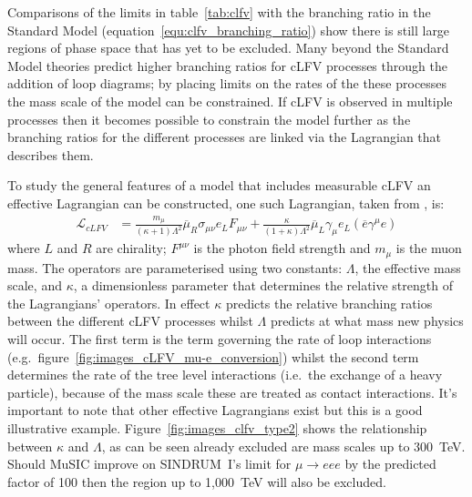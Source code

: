 Comparisons of the limits in table~\ref{tab:clfv} with the branching ratio in the Standard Model (equation~\eqref{equ:clfv_branching_ratio}) show there is still large regions of phase space that has yet to be excluded. Many beyond the Standard Model theories predict higher branching ratios for cLFV processes through the addition of loop diagrams; by placing limits on the rates of the these processes the mass scale of the model can be constrained. If cLFV is observed in multiple processes then it becomes possible to constrain the model further as the branching ratios for the different processes are linked via the Lagrangian that describes them.

To study the general features of a model that includes measurable cLFV an effective Lagrangian can be constructed, one such Lagrangian, taken from \cite{effective_lagrangian_for_clfv}, is:
\begin{align}
  \mathcal{L}_{cLFV} &= 
      \frac{m_{\mu}}{(\kappa + 1)\Lambda^2}
      \overline{\mu}_R\sigma_{\mu\nu}e_L F_{\mu\nu} + 
      \frac{\kappa}{(1+\kappa)\Lambda^2}
      \overline{\mu}_L\gamma_{\mu}e_L
      (\overline{e}\gamma^{\mu}e) \label{equ:type2}
\end{align}
where \(L\) and \(R\) are chirality; \(F^{\mu\nu}\) is the photon field strength and \( m_{\mu} \) is the muon mass. The operators are parameterised using two constants: \(\Lambda\), the effective mass scale, and \(\kappa\), a dimensionless parameter that determines the relative strength of the Lagrangians' operators. In effect \(\kappa\) predicts the relative branching ratios between the different cLFV processes whilst \(\Lambda\) predicts at what mass new physics will occur. The first term is the term governing the rate of loop interactions (e.g.\ figure~\ref{fig:images_cLFV_mu-e_conversion}) whilst the second term determines the rate of the tree level interactions (i.e.\ the exchange of a heavy particle), because of the mass scale these are treated as contact interactions. It's important to note that other effective Lagrangians exist but this is a good illustrative example. Figure~\ref{fig:images_clfv_type2} shows the relationship between \(\kappa\) and \(\Lambda\), as can be seen already excluded are mass scales up to 300~TeV. Should MuSIC improve on SINDRUM~I's limit for \( \mu\rightarrow eee \) by the predicted factor of 100 then the region up to 1,000~TeV will also be excluded.

